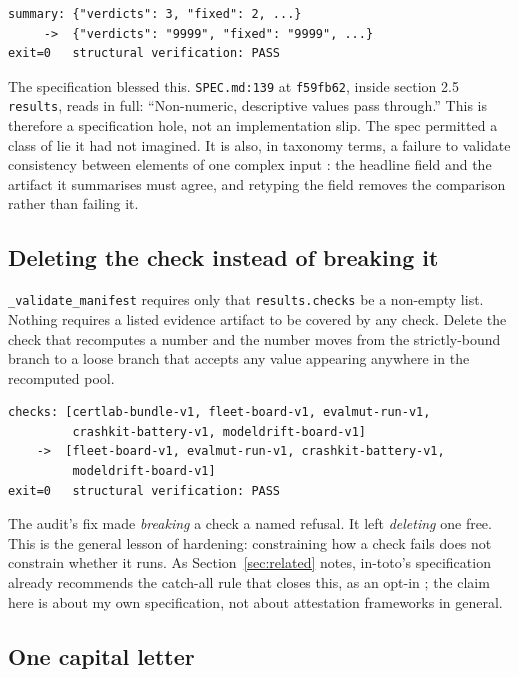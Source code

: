 \documentclass[11pt]{article}
\begin{document}
\begin{Verbatim}[frame=single,fontsize=\small]
summary: {"verdicts": 3, "fixed": 2, ...}
     ->  {"verdicts": "9999", "fixed": "9999", ...}
exit=0   structural verification: PASS
\end{Verbatim}

The specification blessed this. \texttt{SPEC.md:139} at \texttt{f59fb62}, inside section 2.5
\texttt{results}, reads in full: ``Non-numeric, descriptive values pass through.'' This is
therefore a specification hole, not an implementation slip. The spec permitted a class of lie
it had not imagined. It is also, in taxonomy terms, a failure to validate consistency between
elements of one complex input \citep{cwe1288}: the headline field and the artifact it
summarises must agree, and retyping the field removes the comparison rather than failing it.

\subsection{Deleting the check instead of breaking it}
\label{sec:sec-forge-check}

\texttt{\_validate\_manifest} requires only that \texttt{results.checks} be a non-empty list.
Nothing requires a listed evidence artifact to be covered by any check. Delete the check that
recomputes a number and the number moves from the strictly-bound branch to a loose branch
that accepts any value appearing anywhere in the recomputed pool.

\begin{Verbatim}[frame=single,fontsize=\small]
checks: [certlab-bundle-v1, fleet-board-v1, evalmut-run-v1,
         crashkit-battery-v1, modeldrift-board-v1]
    ->  [fleet-board-v1, evalmut-run-v1, crashkit-battery-v1,
         modeldrift-board-v1]
exit=0   structural verification: PASS
\end{Verbatim}

The audit's fix made \emph{breaking} a check a named refusal. It left \emph{deleting} one
free. This is the general lesson of hardening: constraining how a check fails does not
constrain whether it runs. As Section~\ref{sec:related} notes, in-toto's specification
already recommends the catch-all rule that closes this, as an opt-in
\citep{intoto2023spec}; the claim here is about my own specification, not about attestation
frameworks in general.

\subsection{One capital letter}
\label{sec:sec-forge-severity}
\end{document}

